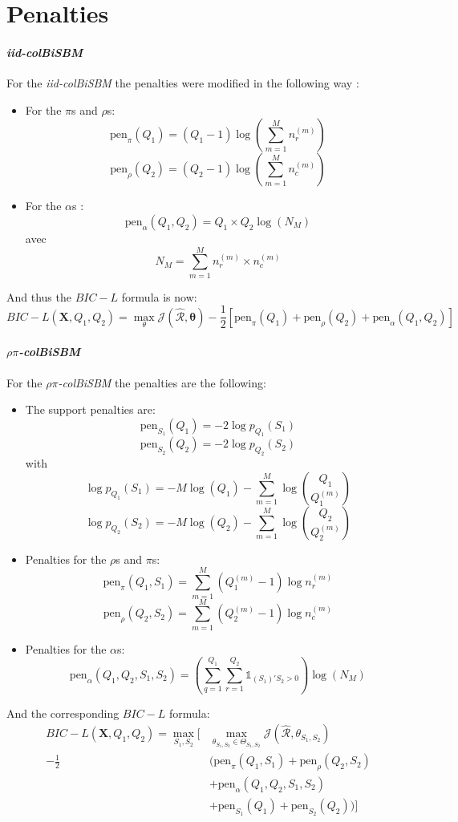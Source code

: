 \documentclass[12pt,a4paper]{rapport1}
\begin{document}
\section{Penalties}

\paragraph*{\textit{iid-colBiSBM}}
For the \textit{iid-colBiSBM} the penalties were modified in the following way :

\begin{itemize}
    \item For the $\pi$s and $\rho$s:
    \[\text{pen}_{\pi}(Q_1) = (Q_1 - 1)\log(\sum_{m=1}^{M}n_{r}^{(m)})\]
    \[\text{pen}_{\rho}(Q_2) = (Q_2 - 1)\log(\sum_{m=1}^{M}n_{c}^{(m)})\]
    \item For the $\alpha$s :
    \[\text{pen}_{\alpha}(Q_1, Q_2) = Q_1 \times Q_2 \log(N_M)\]
    avec
    \[ N_M = \sum_{m = 1}^{M} n_{r}^{(m)} \times n_{c}^{(m)} \]
\end{itemize}
And thus the $BIC-L$ formula is now:
\[ \text{$BIC-L$}(\bm{X},Q_1, Q_2) = \max_{\theta} \mathcal{J} (\mathcal{\hat{R}}, \bm{\theta}) 
- \frac{1}{2} [\text{pen}_{\pi}(Q_1) + \text{pen}_{\rho}(Q_2) + \text{pen}_{\alpha}(Q_1, Q_2)]\]

\paragraph*{\textit{$\rho\pi$-colBiSBM}}
For the \textit{$\rho\pi$-colBiSBM} the penalties are the following:

\begin{itemize}
    \item The support penalties are:
    \[ \text{pen}_{S_1}(Q_1) = -2 \log p_{Q_1} (S_1) \]
    \[ \text{pen}_{S_2}(Q_2) = -2 \log p_{Q_2} (S_2) \]
    with
    \[ \log p_{Q_1}(S_1) = - M \log(Q_1) - \sum_{m=1}^{M} \log {Q_1 \choose Q_1^{(m)}} \]
    \[ \log p_{Q_2}(S_2) = - M \log(Q_2) - \sum_{m=1}^{M} \log {Q_2 \choose Q_2^{(m)}} \]
    \item Penalties for the $\rho$s and $\pi$s:
    \[ \text{pen}_{\pi}(Q_1, S_1) = \sum_{m=1}^{M} (Q_{1}^{(m)} - 1) \log n_{r}^{(m)} \]
    \[ \text{pen}_{\rho}(Q_2, S_2) = \sum_{m=1}^{M} (Q_{2}^{(m)} - 1) \log n_{c}^{(m)} \]
    \item Penalties for the $\alpha$s:
    \[ \text{pen}_{\alpha}(Q_1, Q_2, S_1, S_2) = (\sum_{q=1}^{Q_1} \sum_{r=1}^{Q_2} \mathbb{1}_{(S_1)'S_2 > 0}) \log (N_M) \]
\end{itemize}
And the corresponding $BIC-L$ formula:
\[
    \begin{aligned}
        \text{$BIC-L$}(\bm{X},Q_1, Q_2) = 
        \max_{S_1,S_2} [
            & \max_{\theta_{S_1,S_2} \in \Theta_{S_1,S_2}} \mathcal{J}(\mathcal{\hat{R}},\theta_{S_1,S_2})\\
            - \frac{1}{2} & (\text{pen}_{\pi}(Q_1, S_1)  + \text{pen}_{\rho}(Q_2, S_2)\\
            &+ \text{pen}_{\alpha}(Q_1, Q_2, S_1, S_2)\\
            &+ \text{pen}_{S_1}(Q_1) + \text{pen}_{S_2}(Q_2))]\\
    \end{aligned}
\]
\end{document}
